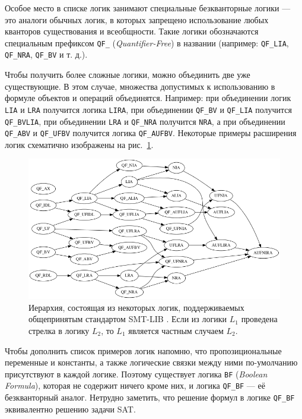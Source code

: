 
Особое место в списке логик занимают специальные безкванторные логики --- это аналоги обычных логик, в которых запрещено использование любых кванторов существования и всеобщности. Такие логики обозначаются специальным префиксом \texttt{QF\_} (\textit{Quantifier-Free}) в названии (например: \texttt{QF\_LIA}, \texttt{QF\_NRA}, \texttt{QF\_BV} и т. д.).

Чтобы получить более сложные логики, можно объединить две уже существующие. В этом случае, множества допустимых к использованию в формуле объектов и операций объединятся. Например: при объединении логик \texttt{LIA} и \texttt{LRA} получится логика \texttt{LIRA}, при объединении \texttt{QF\_BV} и \texttt{QF\_LIA} получится \texttt{QF\_BVLIA}, при объединении \texttt{LRA} и \texttt{QF\_NRA} получится \texttt{NRA}, а при объединении \texttt{QF\_ABV} и \texttt{QF\_UFBV} получится логика \texttt{QF\_AUFBV}. Некоторые примеры расширения логик схематично изображены на рис.~\ref{smt-logics}.

\begin{figure}[ht]
\begin{center}
    \includegraphics[scale=0.5]{./assets/smt-logics.png}
    \caption{\label{smt-logics} Иерархия, состоящая из некоторых логик, поддерживаемых общепринятым стандартом SMT-LIB \cite{smt-logics-picture}. Если из логики $L_1$ проведена стрелка в логику $L_2$, то $L_1$ является частным случаем $L_2$.}
\end{center}
\end{figure}

Чтобы дополнить список примеров логик напомню, что пропозициональные переменные и константы, а также логические связки между ними по-умолчанию присутствуют в каждой логике. Поэтому существует логика \texttt{BF} (\textit{Boolean Formula}), которая не содержит ничего кроме них, и логика \texttt{QF\_BF} --- её безкванторный аналог. Нетрудно заметить, что решение формул в логике \texttt{QF\_BF} эквивалентно решению задачи SAT.

